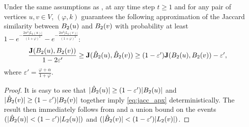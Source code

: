 \begin{corollary}\label{cor:jacc}
  Under the same assumptions as , at any time step $t \geq 1$ and for any pair of vertices $u,v \in V$, \lazyscheme$(\varphi,k)$ guarantees the following approximation of the Jaccard similarity between $B_2(u)$ and $B_2(v)$ with probability at least $1 - e^{-\frac{2\alpha^2|L_2(u)|}{(1 + \varphi)^2}} - e^{-\frac{2\alpha^2|L_2(v)|}{(1 + \varphi)^2}}$: 
    \begin{equation}\label{eq:jacc_apx}
        \textstyle \dfrac{\mathbf J(B_2(u),B_2(v))}{1-2\varepsilon'} \geq \mathbf J(\hat{B}_2(u), \hat{B}_2(v)) \geq (1-\varepsilon')\mathbf J(B_2(u),B_2(v)) - \varepsilon',
    \end{equation}
    where $\varepsilon' = \frac{\varphi + \alpha}{1 + \varphi}$.
\end{corollary}
\begin{proof}
It is easy to see that $|\hat{B}_2(u)|\ge (1 - \varepsilon')|B_2(u)|$ and $|\hat{B}_2(v)|\ge (1 - \varepsilon')|B_2(v)|$ together imply \eqref{eq:jacc_apx} deterministically. The result then immediately follows from  and a union bound on the events $(|\hat{B}_2(u)| < (1 - \varepsilon')|L_2(u)|)$ and $(|\hat{B}_2(v)| < (1 - \varepsilon')|L_2(v)|)$.
\end{proof}

